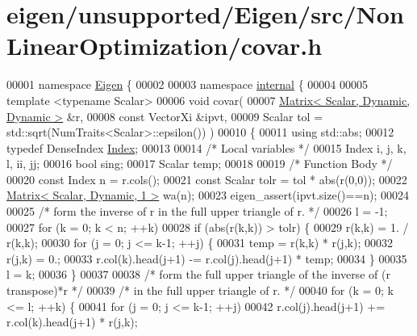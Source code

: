 \hypertarget{eigen_2unsupported_2_eigen_2src_2_non_linear_optimization_2covar_8h_source}{}\section{eigen/unsupported/\+Eigen/src/\+Non\+Linear\+Optimization/covar.h}
\label{eigen_2unsupported_2_eigen_2src_2_non_linear_optimization_2covar_8h_source}

\begin{DoxyCode}
00001 \textcolor{keyword}{namespace }\hyperlink{namespace_eigen}{Eigen} \{ 
00002 
00003 \textcolor{keyword}{namespace }\hyperlink{namespaceinternal}{internal} \{
00004 
00005 \textcolor{keyword}{template} <\textcolor{keyword}{typename} Scalar>
00006 \textcolor{keywordtype}{void} covar(
00007         \hyperlink{group___core___module}{Matrix< Scalar, Dynamic, Dynamic >} &r,
00008         \textcolor{keyword}{const} VectorXi &ipvt,
00009         Scalar tol = std::sqrt(NumTraits<Scalar>::epsilon()) )
00010 \{
00011     \textcolor{keyword}{using} std::abs;
00012     \textcolor{keyword}{typedef} DenseIndex \hyperlink{namespace_eigen_a62e77e0933482dafde8fe197d9a2cfde}{Index};
00013 
00014     \textcolor{comment}{/* Local variables */}
00015     Index i, j, k, l, ii, jj;
00016     \textcolor{keywordtype}{bool} sing;
00017     Scalar temp;
00018 
00019     \textcolor{comment}{/* Function Body */}
00020     \textcolor{keyword}{const} Index n = r.cols();
00021     \textcolor{keyword}{const} Scalar tolr = tol * abs(r(0,0));
00022     \hyperlink{group___core___module}{Matrix< Scalar, Dynamic, 1 >} wa(n);
00023     eigen\_assert(ipvt.size()==n);
00024 
00025     \textcolor{comment}{/* form the inverse of r in the full upper triangle of r. */}
00026     l = -1;
00027     \textcolor{keywordflow}{for} (k = 0; k < n; ++k)
00028         \textcolor{keywordflow}{if} (abs(r(k,k)) > tolr) \{
00029             r(k,k) = 1. / r(k,k);
00030             \textcolor{keywordflow}{for} (j = 0; j <= k-1; ++j) \{
00031                 temp = r(k,k) * r(j,k);
00032                 r(j,k) = 0.;
00033                 r.col(k).head(j+1) -= r.col(j).head(j+1) * temp;
00034             \}
00035             l = k;
00036         \}
00037 
00038     \textcolor{comment}{/* form the full upper triangle of the inverse of (r transpose)*r */}
00039     \textcolor{comment}{/* in the full upper triangle of r. */}
00040     \textcolor{keywordflow}{for} (k = 0; k <= l; ++k) \{
00041         \textcolor{keywordflow}{for} (j = 0; j <= k-1; ++j)
00042             r.col(j).head(j+1) += r.col(k).head(j+1) * r(j,k);

\end{DoxyCode}
